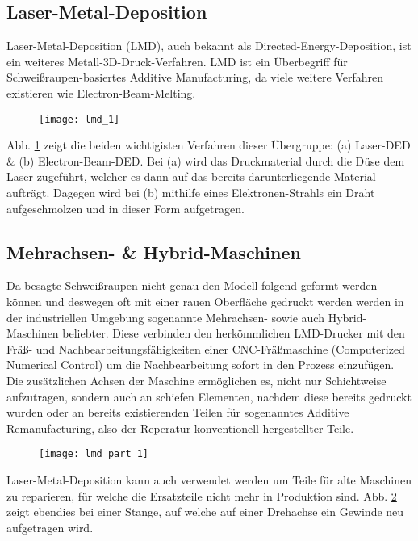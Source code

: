 \documentclass[../main.tex]{subfiles}
\begin{document}
\subsection{Laser-Metal-Deposition}
Laser-Metal-Deposition (LMD), auch bekannt als Directed-Energy-Deposition, ist ein weiteres Metall-3D-Druck-Verfahren. LMD ist ein Überbegriff für Schweißraupen-basiertes Additive Manufacturing, da viele weitere Verfahren existieren wie Electron-Beam-Melting.
\begin{figure}[h!]
	\begin{center}

		\texttt{[image: lmd\_1]}
\label{img:lmd_1}	
	\end{center}
\end{figure}
Abb. \ref{img:lmd_1} zeigt die beiden wichtigisten Verfahren dieser Übergruppe: (a) Laser-DED \& (b) Electron-Beam-DED.
Bei (a) wird das Druckmaterial durch die Düse dem Laser zugeführt, welcher es dann auf das bereits darunterliegende Material aufträgt. 
Dagegen wird bei (b) mithilfe eines Elektronen-Strahls ein Draht aufgeschmolzen und in dieser Form aufgetragen. \parencite{ALL3D_1}
\subsection{Mehrachsen- \& Hybrid-Maschinen}

Da besagte Schweißraupen nicht genau den Modell folgend geformt werden können und deswegen oft mit einer rauen Oberfläche gedruckt werden werden in der industriellen Umgebung sogenannte Mehrachsen- sowie auch Hybrid-Maschinen beliebter. Diese verbinden den herkömmlichen LMD-Drucker mit den Fräß- und Nachbearbeitungsfähigkeiten einer CNC-Fräßmaschine (Computerized Numerical Control) um die Nachbearbeitung sofort in den Prozess einzufügen.
Die zusätzlichen Achsen der Maschine ermöglichen es, nicht nur Schichtweise aufzutragen, sondern auch an schiefen Elementen, nachdem diese bereits gedruckt wurden oder an bereits existierenden Teilen für sogenanntes Additive Remanufacturing, also der Reperatur konventionell hergestellter Teile. \parencite{ALL3D_2}
\begin{figure}[h!]
	\begin{center}
	\texttt{[image: lmd\_part\_1]}	
		\label{img:lmd_part_1}
	\end{center}
	
\end{figure}

Laser-Metal-Deposition kann auch verwendet werden um Teile für alte Maschinen zu reparieren, für welche die Ersatzteile nicht mehr in Produktion sind.
Abb. \ref{img:lmd_part_1} zeigt ebendies bei einer Stange, auf welche auf einer Drehachse ein Gewinde neu aufgetragen wird. 
\end{document}
